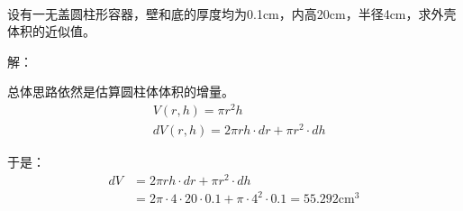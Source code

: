 ~

\begin{exercise}
设有一无盖圆柱形容器，壁和底的厚度均为0.1cm，内高20cm，半径4cm，求外壳体积的近似值。
\end{exercise}

解：

总体思路依然是估算圆柱体体积的增量。
\begin{align*}
&V\left( r,h \right) =\pi r^2h \\
&dV\left( r,h \right) =2\pi rh\cdot dr+\pi r^2\cdot dh
\end{align*}

于是：
\begin{align*}
dV&=2\pi rh\cdot dr+\pi r^2\cdot dh \\
&=2\pi \cdot 4\cdot 20\cdot 0.1+\pi \cdot 4^2\cdot 0.1=55.292\mathrm{cm}^3
\end{align*}




